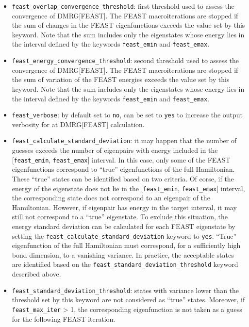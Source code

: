 \documentclass[bibliography=totoc,12pt,a4paper]{scrartcl}
\begin{document}
\begin{itemize}
  \item \texttt{feast\_overlap\_convergence\_threshold}: first threshold used to assess the convergence of DMRG[FEAST].
  The FEAST macroiterations are stopped if the sum of changes in the FEAST eigenfunctions exceeds the value set by this keyword.
  Note that the sum includes only the eigenstates whose energy lies in the interval defined by the keywords \texttt{feast\_emin} and \texttt{feast\_emax}.
  \item \texttt{feast\_energy\_convergence\_threshold}: second threshold used to assess the convergence of DMRG[FEAST].
  The FEAST macroiterations are stopped if the sum of variation of the FEAST energies exceeds the value set by this keyword.
  Note that the sum includes only the eigenstates whose energy lies in the interval defined by the keywords \texttt{feast\_emin} and \texttt{feast\_emax}.
  \item \texttt{feast\_verbose}: by default set to \texttt{no}, can be set to \texttt{yes} to increase the output verbosity for at DMRG[FEAST] calculation.
  \item \texttt{feast\_calculate\_standard\_deviation}: it may happen that the number of guesses exceeds the number of eigenpairs with energy included in the [\texttt{feast\_emin}, \texttt{feast\_emax}] interval.
  In this case, only some of the FEAST eigenfunctions correspond to ``true'' eigenfunctions of the full Hamiltonian.
  These ``true'' states can be identified based on two criteria. 
  Of corse, if the energy of the eigenstate does not lie in the [\texttt{feast\_emin}, \texttt{feast\_emax}] interval, the corresponding state does not correspond to an eigenpair of the Hamiltonian.
  However, if eigenpair has energy in the target interval, it may still not correspond to a ``true'' eigenstate.
  To exclude this situation, the energy standard deviation can be calculated for each FEAST eigenstate by setting the \texttt{feast\_calculate\_standard\_deviation} keyword to \texttt{yes}.
  ``True'' eigenfunction of the full Hamiltonian must correspond, for a sufficiently high bond dimension, to a vanishing variance.
  In practice, the acceptable states are identified based on the \texttt{feast\_standard\_deviation\_threshold} keyword described above. 
  \item \texttt{feast\_standard\_deviation\_threshold}: states with variance lower than the threshold set by this keyword are not considered as ``true'' states.
  Moreover, if \texttt{feast\_max\_iter} > 1, the corresponding eigenfunction is not taken as a guess for the following FEAST iteration.
\end{itemize}
\end{document}
